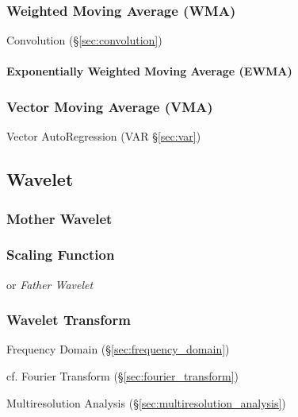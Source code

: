 \subsubsection{Weighted Moving Average (WMA)}\label{sec:wma}

Convolution (\S\ref{sec:convolution})



\paragraph{Exponentially Weighted Moving Average (EWMA)}\label{sec:ewma}\hfill



\subsubsection{Vector Moving Average (VMA)}\label{sec:vma}

Vector AutoRegression (VAR \S\ref{sec:var})



\subsection{Wavelet}\label{sec:wavelet}

\subsubsection{Mother Wavelet}\label{sec:mother_transform}

\subsubsection{Scaling Function}\label{sec:scaling_function}

or \emph{Father Wavelet}



\subsubsection{Wavelet Transform}\label{sec:wavelet_transform}

Frequency Domain (\S\ref{sec:frequency_domain})

cf. Fourier Transform (\S\ref{sec:fourier_transform})

Multiresolution Analysis (\S\ref{sec:multiresolution_analysis})

